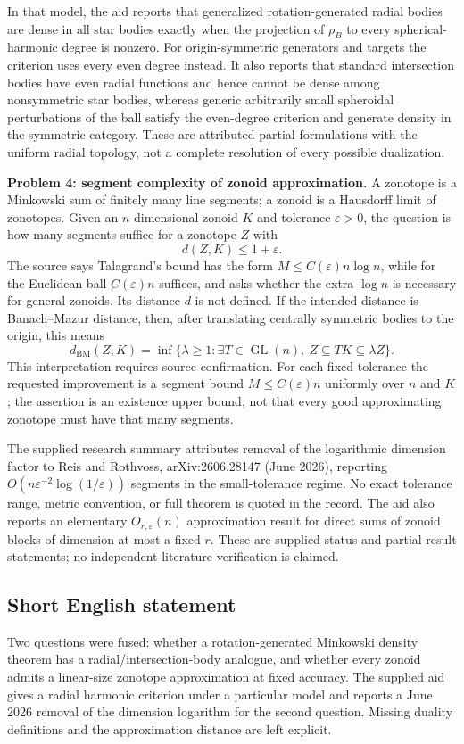 \documentclass[11pt]{article}
\begin{document}
In that model, the aid reports that generalized rotation-generated radial bodies are dense in all star bodies exactly when the projection of $\rho_B$ to every spherical-harmonic degree is nonzero. For origin-symmetric generators and targets the criterion uses every even degree instead. It also reports that standard intersection bodies have even radial functions and hence cannot be dense among nonsymmetric star bodies, whereas generic arbitrarily small spheroidal perturbations of the ball satisfy the even-degree criterion and generate density in the symmetric category. These are attributed partial formulations with the uniform radial topology, not a complete resolution of every possible dualization.

\textbf{Problem 4: segment complexity of zonoid approximation.} A zonotope is a Minkowski sum of finitely many line segments; a zonoid is a Hausdorff limit of zonotopes. Given an $n$-dimensional zonoid $K$ and tolerance $\varepsilon>0$, the question is how many segments suffice for a zonotope $Z$ with
\[
 d(Z,K)\leq1+\varepsilon.
\]
The source says Talagrand's bound has the form $M\leq C(\varepsilon)n\log n$, while for the Euclidean ball $C(\varepsilon)n$ suffices, and asks whether the extra $\log n$ is necessary for general zonoids. Its distance $d$ is not defined. If the intended distance is Banach--Mazur distance, then, after translating centrally symmetric bodies to the origin, this means
\[
 d_{\mathrm{BM}}(Z,K)=\inf\{\lambda\geq1:\exists T\in\operatorname{GL}(n),\ Z\subseteq TK\subseteq\lambda Z\}.
\]
This interpretation requires source confirmation. For each fixed tolerance the requested improvement is a segment bound $M\leq C(\varepsilon)n$ uniformly over $n$ and $K$; the assertion is an existence upper bound, not that every good approximating zonotope must have that many segments.

The supplied research summary attributes removal of the logarithmic dimension factor to Reis and Rothvoss, arXiv:2606.28147 (June 2026), reporting $O(n\varepsilon^{-2}\log(1/\varepsilon))$ segments in the small-tolerance regime. No exact tolerance range, metric convention, or full theorem is quoted in the record. The aid also reports an elementary $O_{r,\varepsilon}(n)$ approximation result for direct sums of zonoid blocks of dimension at most a fixed $r$. These are supplied status and partial-result statements; no independent literature verification is claimed.
\subsection{Short English statement}
Two questions were fused: whether a rotation-generated Minkowski density theorem has a radial/intersection-body analogue, and whether every zonoid admits a linear-size zonotope approximation at fixed accuracy. The supplied aid gives a radial harmonic criterion under a particular model and reports a June 2026 removal of the dimension logarithm for the second question. Missing duality definitions and the approximation distance are left explicit.
\end{document}
